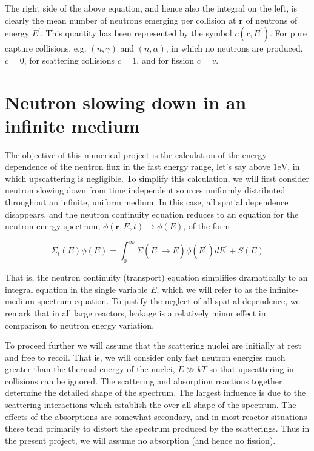 \documentclass[10pt]{article}
\begin{document}
The right side of the above equation, and hence also the integral on the left, is clearly the mean number of neutrons emerging per collision at $\mathbf{r}$ of neutrons of energy $E^{\prime}$. This quantity has been represented by the symbol $c\left(\mathbf{r}, E^{\prime}\right)$. For pure capture collisions, e.g. $(n, \gamma)$ and $(n, \alpha)$, in which no neutrons are produced, $c=0$, for scattering collisions $c=1$, and for fission $c=v$.

\section{Neutron slowing down in an infinite medium}
The objective of this numerical project is the calculation of the energy dependence of the neutron flux in the fast energy range, let's say above $1 \mathrm{eV}$, in which upscattering is negligible. To simplify this calculation, we will first consider neutron slowing down from time independent sources uniformly distributed throughout an infinite, uniform medium. In this case, all spatial dependence disappears, and the neutron continuity equation reduces to an equation for the neutron energy spectrum, $\phi(\mathbf{r}, E, t) \rightarrow \phi(E)$, of the form

$$
\Sigma_{t}(E) \phi(E)=\int_{0}^{\infty} \Sigma\left(E^{\prime} \rightarrow E\right) \phi\left(E^{\prime}\right) d E^{\prime}+S(E)
$$

That is, the neutron continuity (transport) equation simplifies dramatically to an integral equation in the single variable $E$, which we will refer to as the infinite-medium spectrum equation. To justify the neglect of all spatial dependence, we remark that in all large reactors, leakage is a relatively minor effect in comparison to neutron energy variation.

To proceed further we will assume that the scattering nuclei are initially at rest and free to recoil. That is, we will consider only fast neutron energies much greater than the thermal energy of the nuclei, $E \gg k T$ so that upscattering in collisions can be ignored. The scattering and absorption reactions together determine the detailed shape of the spectrum. The largest influence is due to the scattering interactions which establish the over-all shape of the spectrum. The effects of the absorptions are somewhat secondary, and in most reactor situations these tend primarily to distort the spectrum produced by the scatterings. Thus in the present project, we will assume no absorption (and hence no fission).
\end{document}
